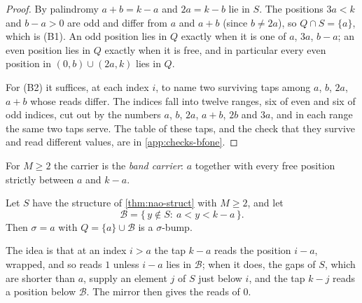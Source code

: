 \begin{proof}
By palindromy $a+b=k-a$ and $2a=k-b$ lie in $S$. The positions $3a<k$ and
$b-a>0$ are odd and differ from $a$ and $a+b$ (since $b\ne2a$), so
$Q\cap S=\{a\}$, which is (B1). An odd position lies in $Q$ exactly when it
is one of $a$, $3a$, $b-a$; an even position lies in $Q$ exactly when it is
free, and in particular every even position in $(0,b)\cup(2a,k)$ lies in $Q$.

For (B2) it suffices, at each index $i$, to name two surviving taps among
$a$, $b$, $2a$, $a+b$ whose reads differ. The indices fall into twelve
ranges, six of even and six of odd indices, cut out by the numbers $a$, $b$,
$2a$, $a+b$, $2b$ and $3a$, and in each range the same two taps serve. The
table of these taps, and the check that they survive and read different
values, are in \autoref{app:checks-bfone}.
\end{proof}

For $M\ge2$ the carrier is the \emph{band carrier}: $a$ together with every
free position strictly between $a$ and $k-a$.

\begin{lemma}
\label{lem:nao-bfshadow}
Let $S$ have the structure of \autoref{thm:nao-struct} with $M\ge2$, and let
\[
\mathcal B=\{\,y\notin S:\ a<y<k-a\,\}.
\]
Then $\sigma=a$ with $Q=\{a\}\cup\mathcal B$ is a $\sigma$-bump.
\end{lemma}

The idea is that at an index $i>a$ the tap $k-a$ reads the position $i-a$,
wrapped, and so reads $1$ unless $i-a$ lies in $\mathcal B$; when it does, the
gaps of $S$, which are shorter than $a$, supply an element $j$ of $S$ just
below $i$, and the tap $k-j$ reads a position below $\mathcal B$. The mirror then
gives the reads of $0$.

